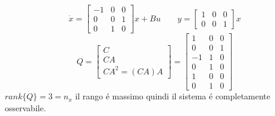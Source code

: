 \documentclass[../main.tex]{subfiles}
\begin{document}
		\begin{mdframed}[style=Exercise]
			\begin{Exercise}[title={Calcolare $ X_{NO} $}, difficulty=1]
				\[
					\dot x =
					\begin{bmatrix}
						-1 & 0 & 0\\
						0 & 0 & 1\\
						0 & 1 & 0
					\end{bmatrix} x + Bu
					\qquad
					y =
					\begin{bmatrix}
						1 & 0 & 0\\
						0 & 0 & 1
					\end{bmatrix} x
				\]
				\[
					Q =
					\begin{bmatrix}
						C\\
						CA\\
						CA^2 = (CA)A
					\end{bmatrix} =
					\begin{bmatrix}
						1 & 0 & 0\\
						0 & 0 & 1\\
						\hline
						-1 & 1 & 0\\
						0 & 1 & 0\\
						\hline
						1 & 0 & 0\\
						0 & 1 & 0
					\end{bmatrix}
				\]
				$ rank\{Q\} = 3 = n_x $ il rango \'e massimo quindi il sistema \'e completamente osservabile.
				

\end{Exercise}
\end{mdframed}
\end{document}
